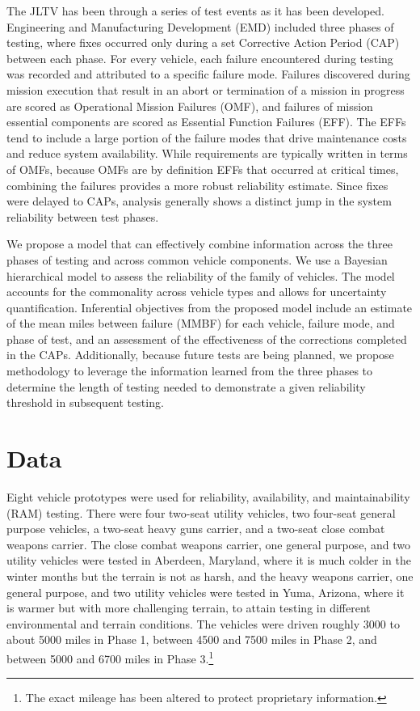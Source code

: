\documentclass[12pt]{article}
\begin{document}
The JLTV has been through a series of test events as it has been developed.
Engineering and Manufacturing Development (EMD) included three phases of
testing, where fixes occurred only during a set Corrective Action Period (CAP)
between each phase. For every vehicle, each failure encountered during testing
was recorded and attributed to a specific failure mode. Failures discovered
during mission execution that result in an abort or termination of a mission in
progress are scored as Operational Mission Failures (OMF), and failures of
mission essential components are scored as Essential Function Failures (EFF).
The EFFs tend to include a large portion of the failure modes that drive
maintenance costs and reduce system availability. While requirements are
typically written in terms of OMFs, because OMFs are by definition EFFs that
occurred at critical times, combining the failures provides a more robust
reliability estimate. Since fixes were delayed to CAPs, analysis generally shows
a distinct jump in the system reliability between test phases.

We propose a model that can effectively combine information across the three
phases of testing and across common vehicle components. We use a Bayesian
hierarchical model to assess the reliability of the family of vehicles. The
model accounts for the commonality across vehicle types and allows for
uncertainty quantification. Inferential objectives from the proposed model
include an estimate of the mean miles between failure (MMBF) for each vehicle,
failure mode, and phase of test, and an assessment of the effectiveness of the
corrections completed in the CAPs. Additionally, because future tests are being
planned, we propose methodology to leverage the information learned from the
three phases to determine the length of testing needed to demonstrate a given
reliability threshold in subsequent testing.

\section{Data}
Eight vehicle prototypes were used for reliability, availability,
and maintainability (RAM) testing. There were four two-seat utility vehicles,
two four-seat general purpose vehicles, a two-seat heavy guns carrier, and a
two-seat close combat weapons carrier. The close combat weapons carrier, one
general purpose, and two utility vehicles were tested in Aberdeen, Maryland,
where it is much colder in the winter months but the terrain is not as harsh,
and the heavy weapons carrier, one general purpose, and two utility vehicles
were tested in Yuma, Arizona, where it is warmer but with more challenging
terrain, to attain testing in different environmental and terrain conditions.
The vehicles were driven roughly 3000 to about 5000 miles in Phase 1, between
4500 and 7500 miles in Phase 2, and between 5000 and 6700 miles in Phase
3.\footnote{The exact mileage has been altered to protect proprietary
information.}
\end{document}
